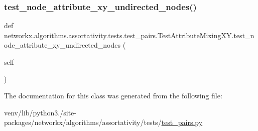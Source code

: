 \subsubsection{\texorpdfstring{test\+\_\+node\+\_\+attribute\+\_\+xy\+\_\+undirected\+\_\+nodes()}{test\_node\_attribute\_xy\_undirected\_nodes()}}
{\footnotesize\ttfamily def networkx.\+algorithms.\+assortativity.\+tests.\+test\+\_\+pairs.\+Test\+Attribute\+Mixing\+X\+Y.\+test\+\_\+node\+\_\+attribute\+\_\+xy\+\_\+undirected\+\_\+nodes (\begin{DoxyParamCaption}\item[{}]{self }\end{DoxyParamCaption})}



The documentation for this class was generated from the following file\+:\begin{DoxyCompactItemize}
\item 
venv/lib/python3./site-\/packages/networkx/algorithms/assortativity/tests/\hyperlink{test__pairs_8py}{test\+\_\+pairs.\+py}\end{DoxyCompactItemize}
